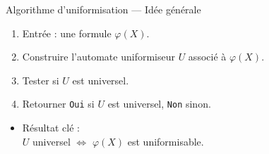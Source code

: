 \documentclass[10pt,xcolor=dvipsnames]{beamer}
\theoremstyle{plain}
\begin{document}
\begin{frame}{Algorithme d’uniformisation — Idée générale}

	\begin{enumerate}
		\item Entrée : une formule $\varphi(X)$.
		\item Construire l’automate uniformiseur $U$ associé à $\varphi(X)$.
		\item Tester si $U$ est universel.
		\item Retourner \texttt{Oui} si $U$ est universel, \texttt{Non} sinon.
	\end{enumerate}

	\begin{itemize}
		\item Résultat clé : \\
		      \vspace{0.3em}
		      \hspace{1em} $U$ universel \quad $\Longleftrightarrow$ \quad $\varphi(X)$ est uniformisable.
	\end{itemize}

\end{frame}
\end{document}
